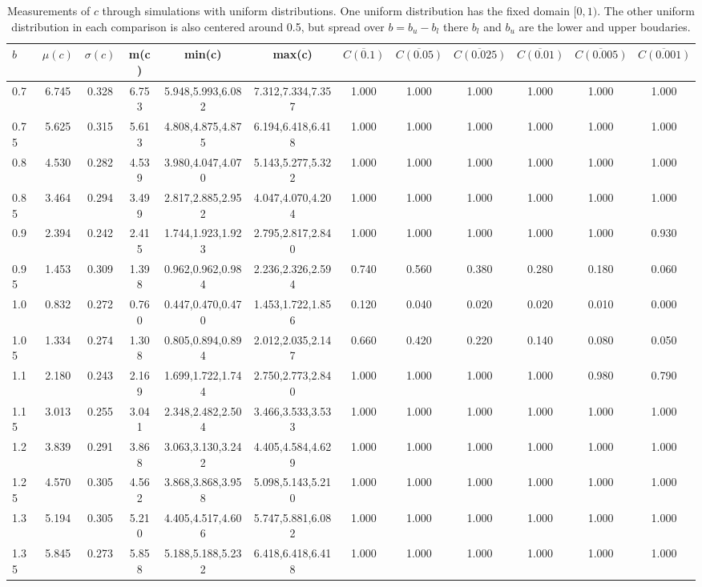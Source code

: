 \begin{table*}[h!]
\begin{center}
\begin{tabular}{| l | c | c | c | c | c | c | c | c | c | c | c |}\hline
$b$ & $\mu(c)$ & $\sigma(c)$ & m(c) & min(c) & max(c) & $\overline{C(0.1)}$ & $\overline{C(0.05)}$ & $\overline{C(0.025)}$ & $\overline{C(0.01)}$ & $\overline{C(0.005)}$ & $\overline{C(0.001)}$ \\\hline
0.7 & 6.745 & 0.328 & 6.753 & 5.948,5.993,6.082 & 7.312,7.334,7.357  & 1.000  & 1.000  & 1.000  & 1.000  & 1.000  & 1.000 \\\hline
0.75 & 5.625 & 0.315 & 5.613 & 4.808,4.875,4.875 & 6.194,6.418,6.418  & 1.000  & 1.000  & 1.000  & 1.000  & 1.000  & 1.000 \\\hline
0.8 & 4.530 & 0.282 & 4.539 & 3.980,4.047,4.070 & 5.143,5.277,5.322  & 1.000  & 1.000  & 1.000  & 1.000  & 1.000  & 1.000 \\\hline
0.85 & 3.464 & 0.294 & 3.499 & 2.817,2.885,2.952 & 4.047,4.070,4.204  & 1.000  & 1.000  & 1.000  & 1.000  & 1.000  & 1.000 \\\hline
0.9 & 2.394 & 0.242 & 2.415 & 1.744,1.923,1.923 & 2.795,2.817,2.840  & 1.000  & 1.000  & 1.000  & 1.000  & 1.000  & 0.930 \\\hline
0.95 & 1.453 & 0.309 & 1.398 & 0.962,0.962,0.984 & 2.236,2.326,2.594  & 0.740  & 0.560  & 0.380  & 0.280  & 0.180  & 0.060 \\\hline
1.0 & 0.832 & 0.272 & 0.760 & 0.447,0.470,0.470 & 1.453,1.722,1.856  & 0.120  & 0.040  & 0.020  & 0.020  & 0.010  & 0.000 \\\hline
1.05 & 1.334 & 0.274 & 1.308 & 0.805,0.894,0.894 & 2.012,2.035,2.147  & 0.660  & 0.420  & 0.220  & 0.140  & 0.080  & 0.050 \\\hline
1.1 & 2.180 & 0.243 & 2.169 & 1.699,1.722,1.744 & 2.750,2.773,2.840  & 1.000  & 1.000  & 1.000  & 1.000  & 0.980  & 0.790 \\\hline
1.15 & 3.013 & 0.255 & 3.041 & 2.348,2.482,2.504 & 3.466,3.533,3.533  & 1.000  & 1.000  & 1.000  & 1.000  & 1.000  & 1.000 \\\hline
1.2 & 3.839 & 0.291 & 3.868 & 3.063,3.130,3.242 & 4.405,4.584,4.629  & 1.000  & 1.000  & 1.000  & 1.000  & 1.000  & 1.000 \\\hline
1.25 & 4.570 & 0.305 & 4.562 & 3.868,3.868,3.958 & 5.098,5.143,5.210  & 1.000  & 1.000  & 1.000  & 1.000  & 1.000  & 1.000 \\\hline
1.3 & 5.194 & 0.305 & 5.210 & 4.405,4.517,4.606 & 5.747,5.881,6.082  & 1.000  & 1.000  & 1.000  & 1.000  & 1.000  & 1.000 \\\hline
1.35 & 5.845 & 0.273 & 5.858 & 5.188,5.188,5.232 & 6.418,6.418,6.418  & 1.000  & 1.000  & 1.000  & 1.000  & 1.000  & 1.000 \\\hline
\end{tabular}
\caption{Measurements of $c$ through simulations
with uniform distributions.
One uniform distribution has the fixed domain $[0,1)$.
The other uniform distribution in each comparison
is also centered around 0.5,
but spread over $b=b_u-b_l$ there $b_l$ and $b_u$ are the lower and upper boudaries.}
\end{center}
\end{table*}
